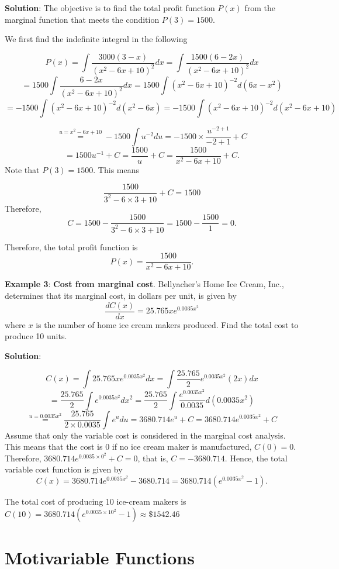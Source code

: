 \documentclass[
]{book}
\begin{document}
\textbf{Solution}: The objective is to find the total profit function \(P(x)\) from the marginal function that meets the condition \(P(3) = 1500\).

We first find the indefinite integral in the following

\[
P(x) = \int \frac{3000(3-x)}{(x^2-6x+10)^2} dx = \int \frac{1500(6-2x)}{(x^2-6x+10)^2} dx 
\]
\[
= 1500\int \frac{6-2x}{(x^2-6x+10)^2} dx = 1500\int (x^2-6x+10)^{-2}d(6x-x^2)
\]
\[
=-1500\int (x^2-6x+10)^{-2}d(x^2-6x) = -1500\int (x^2-6x+10)^{-2}d(x^2-6x + 10)
\]

\[
\stackrel{u=x^2-6x+10}{=} -1500 \int u^{-2}du = -1500\times \frac{u^{-2+1}}{-2+1} + C 
\]
\[
= 1500u^{-1} + C = \frac{1500}{u} + C = \frac{1500}{x^2-6x + 10} + C.
\]
Note that \(P(3) = 1500\). This means

\[
\frac{1500}{3^2 - 6\times 3 + 10} + C = 1500
\]
Therefore,
\[
C = 1500 - \frac{1500}{3^2 - 6\times 3 + 10} = 1500 - \frac{1500}{1} = 0.
\]

Therefore, the total profit function is
\[
P(x) = \frac{1500}{x^2-6x + 10}.
\]

\hfill\break

\textbf{Example 3}: \textbf{Cost from marginal cost}. Bellyacher's Home Ice Cream, Inc., determines that its marginal cost, in dollars per unit, is given by
\[
\frac{dC(x)}{dx} = 25.765xe^{0.0035x^2}
\]
where \(x\) is the number of home ice cream makers produced. Find the total cost to produce 10 units.

\textbf{Solution}:

\[
C(x) = \int 25.765xe^{0.0035x^2} dx = \int \frac{25.765}{2}e^{0.0035x^2} (2x)dx
\]
\[
=\frac{25.765}{2} \int e^{0.0035x^2} dx^2 = \frac{25.765}{2} \int \frac{e^{0.0035x^2}}{0.0035}d(0.0035x^2)
\]
\[
\stackrel{u=0.0035x^2}{=} \frac{25.765}{2\times 0.0035}\int e^udu = 3680.714e^u +C = 3680.714e^{0.0035x^2} +C
\]
Assume that only the variable cost is considered in the marginal cost analysis. This means that the cost is 0 if no ice cream maker is manufactured, \(C(0) = 0\). Therefore, \(3680.714e^{0.0035\times 0^2} +C =0\), that is, \(C = -3680.714\). Hence, the total variable cost function is given by
\[
C(x) = 3680.714e^{0.0035x^2} -3680.714 = 3680.714(e^{0.0035x^2}-1).
\]

The total cost of producing 10 ice-cream makers is \(C(10) = 3680.714(e^{0.0035\times 10^2}-1) \approx \$1542.46\)

\hfill\break

\hypertarget{motivariable-functions}{%
\section{Motivariable Functions}\label{motivariable-functions}}
\end{document}

